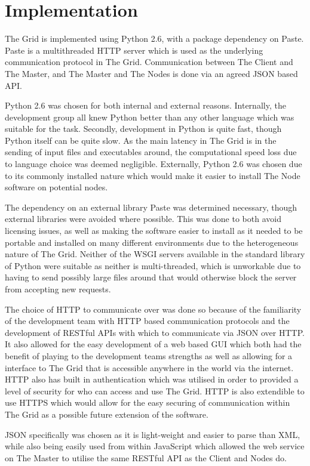 \chapter{Implementation}
The Grid is implemented using Python 2.6, with a package dependency on Paste. Paste is a multithreaded HTTP server which is used as the underlying communication protocol in The Grid. Communication between The Client and The Master, and The Master and The Nodes is done via an agreed JSON based API. 

Python 2.6 was chosen for both internal and external reasons. Internally, the development group all knew Python better than any other language which was suitable for the task. Secondly, development in Python is quite fast, though Python itself can be quite slow. As the main latency in The Grid is in the sending of input files and executables around, the computational speed loss due to language choice was deemed negligible. Externally, Python 2.6 was chosen due to its commonly installed nature which would make it easier to install The Node software on potential nodes. 

The dependency on an external library Paste was determined necessary, though external libraries were avoided where possible. This was done to both avoid licensing issues, as well as making the software easier to install as it needed to be portable and installed on many different environments due to the heterogeneous nature of The Grid. Neither of the WSGI servers available in the standard library of Python were suitable as neither is multi-threaded, which is unworkable due to having to send possibly large files around that would otherwise block the server from accepting new requests.

The choice of HTTP to communicate over was done so because of the familiarity of the development team with HTTP based communication protocols and the development of RESTful APIs with which to communicate via JSON over HTTP. It also allowed for the easy development of a web based GUI which both had the benefit of playing to the development teams strengths as well as allowing for a interface to The Grid that is accessible anywhere in the world via the internet. HTTP also has built in authentication which was utilised in order to provided a level of security for who can access and use The Grid. HTTP is also extendible to use HTTPS which would allow for the easy securing of communication within The Grid as a possible future extension of the software.

JSON specifically was chosen as it is light-weight and easier to parse than XML, while also being easily used from within JavaScript which allowed the web service on The Master to utilise the same RESTful API as the Client and Nodes do. 

